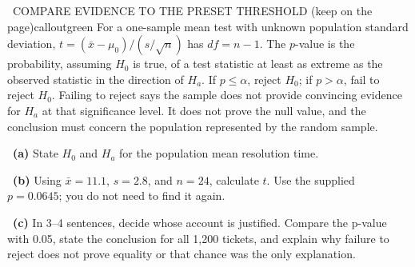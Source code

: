 \documentclass[11pt]{article}
\begin{document}
\begin{callout}{\IconBook\ COMPARE EVIDENCE TO THE PRESET THRESHOLD (keep on the page)}{calloutgreen}
For a one-sample mean test with unknown population standard deviation,
$t=(\bar x-\mu_0)/(s/\sqrt n)$ has $df=n-1$. The $p$-value is the probability, assuming $H_0$ is true,
of a test statistic at least as extreme as the observed statistic in the direction of $H_a$.
If $p\leq\alpha$, reject $H_0$; if $p>\alpha$, fail to reject $H_0$. Failing to reject says the sample
does not provide convincing evidence for $H_a$ at that significance level. It does not prove the null value,
and the conclusion must concern the population represented by the random sample.
\end{callout}

~\textbf{(a)} State $H_0$ and $H_a$ for the population mean resolution time.\par
{}

~\textbf{(b)} Using $\bar x=11.1$, $s=2.8$, and $n=24$, calculate $t$. Use the supplied $p=0.0645$; you do not need to find it again.\par
{}

~\textbf{(c)} In 3--4 sentences, decide whose account is justified. Compare the p-value with 0.05, state the conclusion for all 1,200 tickets, and explain why failure to reject does not prove equality or that chance was the only explanation.\par
{}
\end{document}

